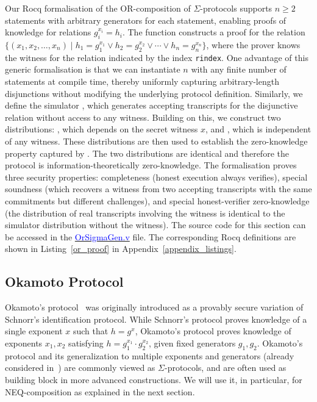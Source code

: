 \documentclass[sigconf,anonymous,review]{acmart}
\begin{document}
Our Rocq formalisation of the OR-composition of $\Sigma$-protocols supports $n \geq 2$ statements with arbitrary generators for each statement, enabling proofs of knowledge for relations $g_i^{x_i} = h_i$. The function \texttt{} constructs a proof for the relation
$\{ (x_1, x_2, \ldots, x_n) \mid h_1 = g_1^{x_1} \lor h_2 = g_2^{x_2} \lor \cdots \lor h_n = g_n^{x_n} \}$, 
where the prover knows the witness for the relation indicated by the index \texttt{rindex}. One advantage of this generic formalisation is that we can instantiate \( n \) with any finite number of statements at compile time, thereby uniformly capturing arbitrary-length disjunctions without modifying the underlying protocol definition.  Similarly, we define the simulator \texttt{}, which generates accepting transcripts for the disjunctive relation without access to any witness. Building on this, we construct two distributions: \texttt{}, which depends on the secret witness \(x\), and \texttt{}, which is independent of any witness. These distributions are then used to establish the zero-knowledge property captured by \texttt{}. The two distributions are identical and therefore the protocol is information-theoretically zero-knowledge. The formalisation proves three security properties: completeness (honest execution always verifies), special soundness (which recovers a witness from two accepting transcripts with the same commitments but different challenges), and special honest-verifier zero-knowledge (the distribution of real transcripts involving the witness is identical to the simulator distribution without the witness). The source code for this section can be accessed in the \href{https://anonymous.4open.science/r/SigmaProtocol-EBA5/src/Crypto/OrSigmaGen.v}{\textcolor{blue}{OrSigmaGen.v}} file. The corresponding Rocq definitions are shown in Listing~\ref{or_proof} in Appendix~\ref{appendix_listings}.



\subsection{Okamoto Protocol}

Okamoto's protocol~\cite[Identification scheme 1]{okamoto1992provably} was originally introduced as a provably secure variation of Schnorr's identification protocol.
While Schnorr's protocol proves knowledge of a single exponent $x$ such that $h = g^x$, Okamoto's protocol proves knowledge of 
exponents $x_1, x_2$ satisfying $h = g_1^{x_1} \cdot g_2^{x_2}$, given fixed generators $g_1,g_2$. Okamoto's protocol and its generalization to multiple exponents and generators
(already considered in~\cite{10.1007/3-540-39118-5_13}) are commonly viewed as $\Sigma$-protocols, and are often used as building block in more advanced constructions.
We will use it, in particular, for NEQ-composition as explained in the next section.
\end{document}
